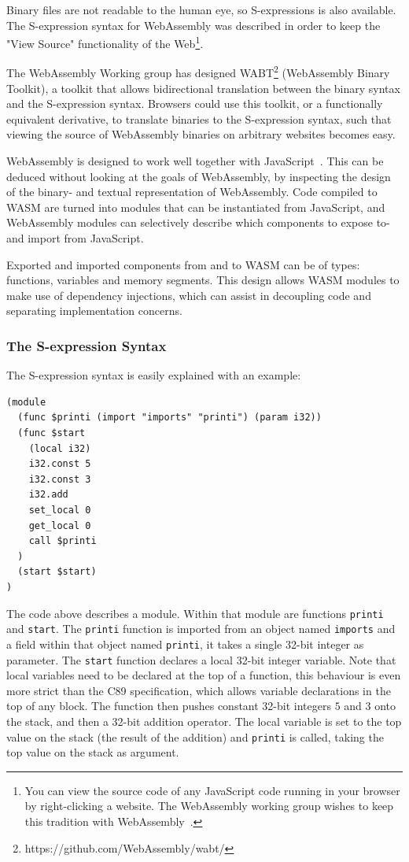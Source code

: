 \documentclass[a4paper]{article}
\begin{document}
Binary files are not readable to the human eye, so S-expressions is also available. The S-expression syntax for WebAssembly was described in order to keep the "View Source" functionality of the Web\footnote{You can view the source code of any JavaScript code running in your browser by right-clicking a website. The WebAssembly working group wishes to keep this tradition with WebAssembly~\cite{website:wasm-webassembly-high-level-goals}.}.

The WebAssembly Working group has designed WABT\footnote{https://github.com/WebAssembly/wabt/} (WebAssembly Binary Toolkit), a toolkit that allows bidirectional translation between the binary syntax and the S-expression syntax. Browsers could use this toolkit, or a functionally equivalent derivative, to translate binaries to the S-expression syntax, such that viewing the source of WebAssembly binaries on arbitrary websites becomes easy.

WebAssembly is designed to work well together with JavaScript~\cite{website:wasm-webassembly-high-level-goals}. This can be deduced without looking at the goals of WebAssembly, by inspecting the design of the binary- and textual representation of WebAssembly. Code compiled to WASM are turned into modules that can be instantiated from JavaScript, and WebAssembly modules can selectively describe which components to expose to- and import from JavaScript.

Exported and imported components from and to WASM can be of types: functions, variables and memory segments. This design allows WASM modules to make use of dependency injections, which can assist in decoupling code and separating implementation concerns.

\subsubsection{The S-expression Syntax}
\label{sec:problem-analysis:webassembly:s-exp}
The S-expression syntax is easily explained with an example:
\begin{verbatim}
(module
  (func $printi (import "imports" "printi") (param i32))
  (func $start
    (local i32)
    i32.const 5
    i32.const 3
    i32.add
    set_local 0
    get_local 0
    call $printi
  )
  (start $start)
)
\end{verbatim}
The code above describes a module. Within that module are functions \texttt{printi} and \texttt{start}. The \texttt{printi} function is imported from an object named \texttt{imports} and a field within that object named \texttt{printi}, it takes a single 32-bit integer as parameter. The \texttt{start} function declares a local 32-bit integer variable. Note that local variables need to be declared at the top of a function, this behaviour is even more strict than the C89 specification, which allows variable declarations in the top of any block. The function then pushes constant 32-bit integers $5$ and $3$ onto the stack, and then a 32-bit addition operator. The local variable is set to the top value on the stack (the result of the addition) and \texttt{printi} is called, taking the top value on the stack as argument.
\end{document}
